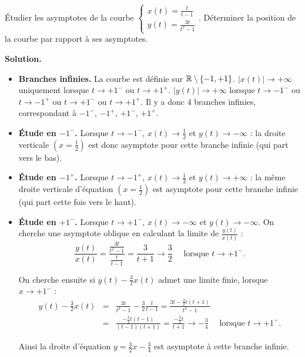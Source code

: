 \documentclass[class=report,crop=false]{standalone}
\begin{document}
\begin{exemple}
Étudier les asymptotes de la courbe
$\left\{\begin{array}{l} x(t) = \frac{t}{t-1} \\ y(t) = \frac{3t}{t^2-1} \end{array}\right..$
Déterminer la position de la courbe par rapport à ses asymptotes.

\medskip
\textbf{Solution.}

\begin{itemize}
  \item \textbf{Branches infinies.}
  La courbe est définie sur $\mathbb{R} \setminus \{-1,+1\}$.
  $|x(t)| \to +\infty$ uniquement lorsque $t \to +1^-$ ou $t\to +1^+$.
  $|y(t)| \to +\infty$ lorsque $t \to -1^-$ ou $t\to -1^+$ ou
  $t \to +1^-$ ou $t \to +1^+$.
  Il y a donc $4$ branches infinies, correspondant à
  $-1^-$, $-1^+$, $+1^-$, $+1^+$.

  \item \textbf{Étude en $-1^-$.}
  Lorsque $t\to-1^-$, $x(t) \to \frac12$ et $y(t) \to -\infty$ :
  la droite verticale $(x=\frac12)$ est donc asymptote
  pour cette branche infinie (qui part vers le bas).


  \item \textbf{Étude en $-1^+$.}
  Lorsque $t\to-1^+$, $x(t) \to \frac12$ et $y(t) \to +\infty$ :
  la même droite verticale d'équation $(x=\frac12)$ est  asymptote
  pour cette branche infinie (qui part cette fois vers le haut).

   \item \textbf{Étude en $+1^-$.}
  Lorsque $t\to +1^-$, $x(t) \to -\infty$ et $y(t) \to -\infty$.
  On cherche une asymptote oblique en calculant la limite de
  $\frac{y(t)}{x(t)}$ :
  $$\frac{y(t)}{x(t)} = \frac{\frac{3t}{t^2-1}}{\frac{t}{t-1}}
  = \frac{3}{t+1} \longrightarrow \frac{3}{2} \quad \text{ lorsque }t\to +1^-.$$

  On cherche ensuite si $y(t)-\frac32 x(t)$ admet une limite finie, lorsque $x\to +1^-$ :
  \begin{eqnarray*}
  y(t)-\frac32 x(t) 
  &=& \frac{3t}{t^2-1} - \frac32 \frac{t}{t-1}
  = \frac{3t - \frac32 t (t+1)}{t^2-1} \\
  &=& \frac{- \frac32 t (t-1)}{(t-1)(t+1)}
  = \frac{- \frac32 t }{t+1}
  \longrightarrow -\frac{3}{4} \quad \text{ lorsque }t\to +1^-.
  \end{eqnarray*}

  Ainsi la droite d'équation $y = \frac32 x -\frac34$ est asymptote à cette branche infinie.


\end{itemize}
\end{exemple}
\end{document}
